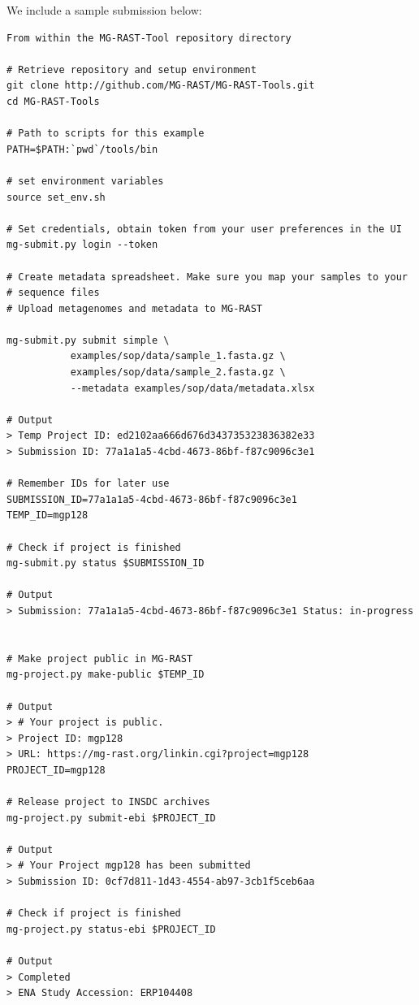 \documentclass[12pt,fullpage]{report}
\begin{document}
We include a sample submission below:
\begin{small}
\begin{verbatim}
From within the MG-RAST-Tool repository directory

# Retrieve repository and setup environment
git clone http://github.com/MG-RAST/MG-RAST-Tools.git
cd MG-RAST-Tools

# Path to scripts for this example
PATH=$PATH:`pwd`/tools/bin

# set environment variables
source set_env.sh

# Set credentials, obtain token from your user preferences in the UI
mg-submit.py login --token

# Create metadata spreadsheet. Make sure you map your samples to your
# sequence files
# Upload metagenomes and metadata to MG-RAST

mg-submit.py submit simple \
           examples/sop/data/sample_1.fasta.gz \
           examples/sop/data/sample_2.fasta.gz \
           --metadata examples/sop/data/metadata.xlsx

# Output
> Temp Project ID: ed2102aa666d676d343735323836382e33
> Submission ID: 77a1a1a5-4cbd-4673-86bf-f87c9096c3e1

# Remember IDs for later use
SUBMISSION_ID=77a1a1a5-4cbd-4673-86bf-f87c9096c3e1
TEMP_ID=mgp128

# Check if project is finished
mg-submit.py status $SUBMISSION_ID

# Output
> Submission: 77a1a1a5-4cbd-4673-86bf-f87c9096c3e1 Status: in-progress


# Make project public in MG-RAST
mg-project.py make-public $TEMP_ID

# Output
> # Your project is public.
> Project ID: mgp128
> URL: https://mg-rast.org/linkin.cgi?project=mgp128
PROJECT_ID=mgp128

# Release project to INSDC archives
mg-project.py submit-ebi $PROJECT_ID

# Output
> # Your Project mgp128 has been submitted
> Submission ID: 0cf7d811-1d43-4554-ab97-3cb1f5ceb6aa

# Check if project is finished
mg-project.py status-ebi $PROJECT_ID

# Output
> Completed
> ENA Study Accession: ERP104408
\end{verbatim}
\end{small}

\end{document}
